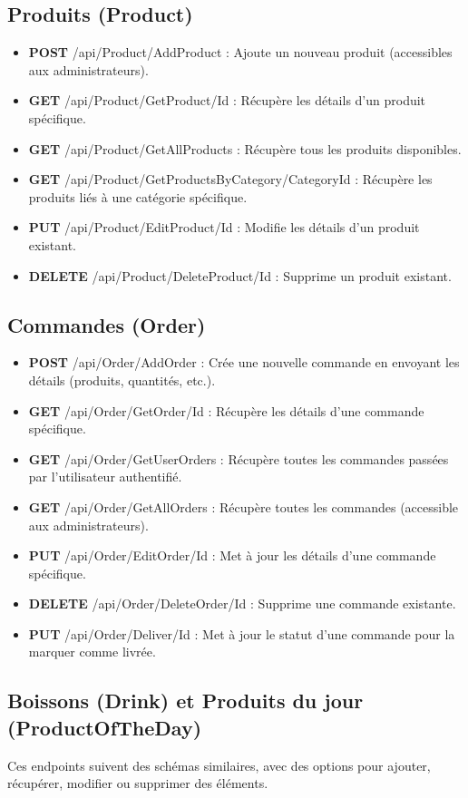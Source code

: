 \subsection*{Produits (Product)}
\begin{itemize}
    \item \textbf{POST} /api/Product/AddProduct : Ajoute un nouveau produit (accessibles aux administrateurs).
    \item \textbf{GET} /api/Product/GetProduct/{Id} : Récupère les détails d'un produit spécifique.
    \item \textbf{GET} /api/Product/GetAllProducts : Récupère tous les produits disponibles.
    \item \textbf{GET} /api/Product/GetProductsByCategory/{CategoryId} : Récupère les produits liés à une catégorie spécifique.
    \item \textbf{PUT} /api/Product/EditProduct/{Id} : Modifie les détails d'un produit existant.
    \item \textbf{DELETE} /api/Product/DeleteProduct/{Id} : Supprime un produit existant.
\end{itemize}

\subsection*{Commandes (Order)}
\begin{itemize}
    \item \textbf{POST} /api/Order/AddOrder : Crée une nouvelle commande en envoyant les détails (produits, quantités, etc.).
    \item \textbf{GET} /api/Order/GetOrder/{Id} : Récupère les détails d'une commande spécifique.
    \item \textbf{GET} /api/Order/GetUserOrders : Récupère toutes les commandes passées par l'utilisateur authentifié.
    \item \textbf{GET} /api/Order/GetAllOrders : Récupère toutes les commandes (accessible aux administrateurs).
    \item \textbf{PUT} /api/Order/EditOrder/{Id} : Met à jour les détails d'une commande spécifique.
    \item \textbf{DELETE} /api/Order/DeleteOrder/{Id} : Supprime une commande existante.
    \item \textbf{PUT} /api/Order/Deliver/{Id} : Met à jour le statut d'une commande pour la marquer comme livrée.
\end{itemize}

\subsection*{Boissons (Drink) et Produits du jour (ProductOfTheDay)}
Ces endpoints suivent des schémas similaires, avec des options pour ajouter, récupérer, modifier ou supprimer des éléments.

